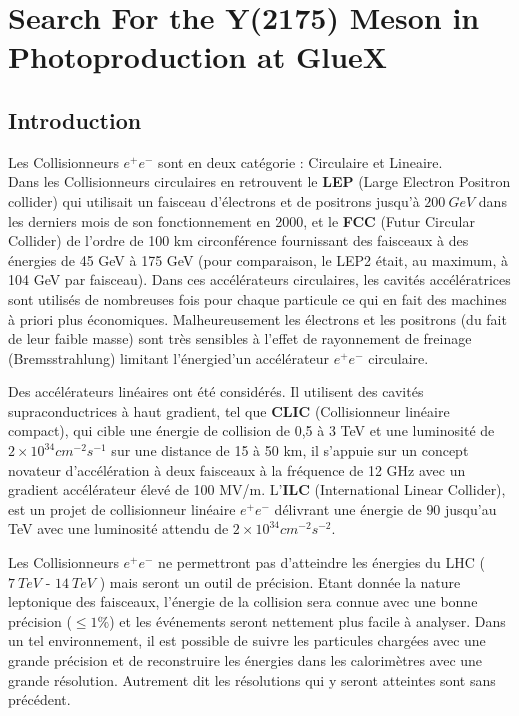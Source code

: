 \section{Search For the Y(2175) Meson in Photoproduction at GlueX}
\label{p4}
\vfill
\subsection{Introduction}
\vfill
Les Collisionneurs $e^{+}e^{-}$ sont en deux cat\'egorie : Circulaire et Lineaire.\\
Dans les Collisionneurs circulaires en retrouvent le {\bfseries LEP} (Large Electron Positron collider) qui utilisait un faisceau d'\'electrons et de positrons jusqu'\`a $200\ GeV$ dans les derniers mois de son fonctionnement en 2000, et le {\bfseries FCC} (Futur Circular Collider) de l’ordre de 100 km circonf\'erence fournissant des faisceaux \`a des \'energies de 45 GeV \`a 175 GeV (pour comparaison, le LEP2 \'etait, au maximum, \`a 104 GeV par faisceau). Dans ces acc\'el\'erateurs circulaires, les cavités accélératrices sont utilis\'es de nombreuses fois pour chaque particule ce qui en fait des machines à priori plus \'economiques. Malheureusement les \'electrons et les positrons (du fait de leur faible masse) sont tr\`es sensibles \`a l'effet de rayonnement de freinage (Bremsstrahlung) limitant l'énergied'un acc\'el\'erateur $e^{+}e^{-}$ circulaire.
~\par Des acc\'el\'erateurs lin\'eaires ont été considérés. Il utilisent des cavit\'es supraconductrices \`a haut gradient, tel que {\bfseries CLIC} (Collisionneur lin\'eaire compact), qui cible une \'energie de collision de 0,5 \`a 3 TeV et une luminosit\'e de $2{\times}10^{34} cm^{-2}s^{-1}$ sur une distance de 15 \`a 50 km, il s’appuie sur un concept novateur d’acc\'el\'eration \`a deux faisceaux \`a la fr\'equence de 12 GHz avec un gradient acc\'el\'erateur \'elev\'e de 100 MV/m. L'{\bfseries ILC} (International Linear Collider), est un projet de collisionneur lin\'eaire $e^{+}e^{-}$ d\'elivrant une \'energie de $90$ jusqu'au TeV avec  une luminosit\'e attendu de $2\times10^{34} cm^{-2}s^{-2}$.
~\par Les Collisionneurs $e^{+}e^{-}$ ne permettront pas d'atteindre les \'energies du LHC ($7\ TeV$ - $14\ TeV$ ) mais seront un outil de pr\'ecision. Etant donn\'ee la nature leptonique des faisceaux, l'\'energie de la collision sera connue avec une bonne pr\'ecision ($\leq1\%$) et les \'ev\'enements seront nettement plus facile \`a analyser. Dans un tel environnement, il est possible de suivre les particules charg\'ees avec une grande pr\'ecision et de reconstruire les \'energies dans les calorim\`etres avec une grande r\'esolution. Autrement dit les r\'esolutions qui y seront atteintes sont sans pr\'ec\'edent.
